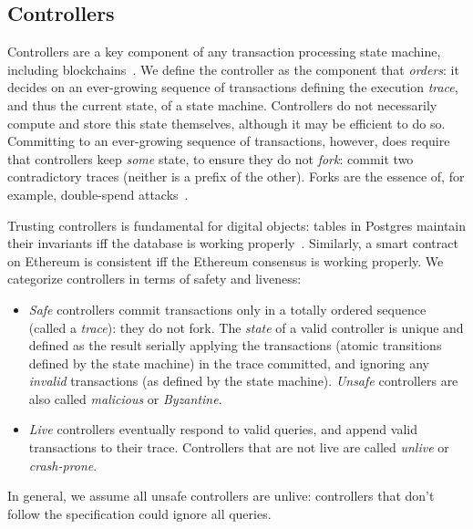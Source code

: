 \documentclass[a4paper,USenglish,cleveref, autoref, thm-restate, anonymous]{lipics-v2021}
\begin{document}
\subsection{Controllers}  
Controllers are a key component of any transaction processing state machine, including blockchains~\cite{smr,statemachine}.
We define the controller as the component that \emph{orders}: it decides on an ever-growing sequence of transactions defining the execution \emph{trace}, and thus the current state, of a state machine.
Controllers do not necessarily compute and store this state themselves, although it may be efficient to do so.
Committing to an ever-growing sequence of transactions, however, does require that controllers keep \textit{some} state, to ensure they do not \emph{fork}: commit two contradictory traces (neither is a prefix of the other).
Forks are the essence of, for example, double-spend attacks~\cite{Abraham2017}.

Trusting controllers is fundamental for digital objects: tables in Postgres maintain their invariants iff the database is working properly~\cite{constraints}.
Similarly, a smart contract on Ethereum is consistent iff the Ethereum consensus is working properly\cite{ethereum}.
We categorize controllers in terms of safety and liveness:
\begin{itemize}
\item \emph{Safe} controllers commit transactions only in a totally ordered sequence (called a \emph{trace}): they do not fork.
The \emph{state} of a valid controller is unique and defined as the result serially applying the transactions (atomic transitions defined by the state machine) in the trace committed, and ignoring any \emph{invalid} transactions (as defined by the state machine).
  \emph{Unsafe} controllers are also called \emph{malicious} or \emph{Byzantine}.  
\item \emph{Live} controllers eventually respond to valid queries, and append valid transactions to their trace.
  Controllers that are not live are called \emph{unlive} or \emph{crash-prone}.
\end{itemize}
In general, we assume all unsafe controllers are unlive: controllers that don't follow the specification could ignore all queries.
\end{document}
